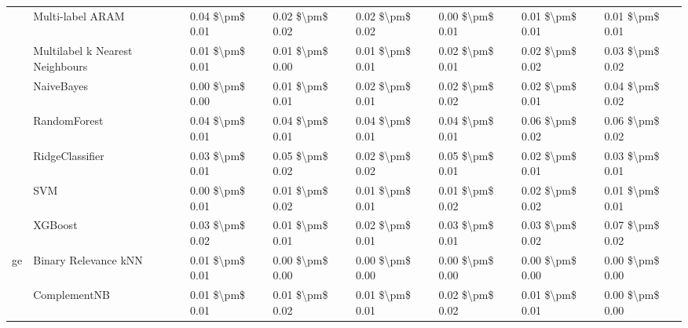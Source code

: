 \begin{tabular}{llllllll}
   & Multi-label ARAM &  0.04 \$\textbackslash pm\$ 0.01 &           0.02 \$\textbackslash pm\$ 0.02 &       0.02 \$\textbackslash pm\$ 0.02 &        0.00 \$\textbackslash pm\$ 0.01 &                         0.01 \$\textbackslash pm\$ 0.01 &      0.01 \$\textbackslash pm\$ 0.01 \\
   & Multilabel k Nearest Neighbours &  0.01 \$\textbackslash pm\$ 0.01 &           0.01 \$\textbackslash pm\$ 0.00 &       0.01 \$\textbackslash pm\$ 0.01 &        0.02 \$\textbackslash pm\$ 0.01 &                         0.02 \$\textbackslash pm\$ 0.02 &      0.03 \$\textbackslash pm\$ 0.02 \\
   & NaiveBayes &  0.00 \$\textbackslash pm\$ 0.00 &           0.01 \$\textbackslash pm\$ 0.01 &       0.02 \$\textbackslash pm\$ 0.01 &        0.02 \$\textbackslash pm\$ 0.02 &                         0.02 \$\textbackslash pm\$ 0.01 &      0.04 \$\textbackslash pm\$ 0.02 \\
   & RandomForest &  0.04 \$\textbackslash pm\$ 0.01 &           0.04 \$\textbackslash pm\$ 0.01 &       0.04 \$\textbackslash pm\$ 0.01 &        0.04 \$\textbackslash pm\$ 0.01 &                         0.06 \$\textbackslash pm\$ 0.02 &      0.06 \$\textbackslash pm\$ 0.02 \\
   & RidgeClassifier &  0.03 \$\textbackslash pm\$ 0.01 &           0.05 \$\textbackslash pm\$ 0.02 &       0.02 \$\textbackslash pm\$ 0.02 &        0.05 \$\textbackslash pm\$ 0.01 &                         0.02 \$\textbackslash pm\$ 0.01 &      0.03 \$\textbackslash pm\$ 0.01 \\
   & SVM &  0.00 \$\textbackslash pm\$ 0.01 &           0.01 \$\textbackslash pm\$ 0.02 &       0.01 \$\textbackslash pm\$ 0.01 &        0.01 \$\textbackslash pm\$ 0.02 &                         0.02 \$\textbackslash pm\$ 0.02 &      0.01 \$\textbackslash pm\$ 0.01 \\
   & XGBoost &  0.03 \$\textbackslash pm\$ 0.02 &           0.01 \$\textbackslash pm\$ 0.01 &       0.02 \$\textbackslash pm\$ 0.01 &        0.03 \$\textbackslash pm\$ 0.01 &                         0.03 \$\textbackslash pm\$ 0.02 &      0.07 \$\textbackslash pm\$ 0.02 \\
ge & Binary Relevance kNN &  0.01 \$\textbackslash pm\$ 0.01 &           0.00 \$\textbackslash pm\$ 0.00 &       0.00 \$\textbackslash pm\$ 0.00 &        0.00 \$\textbackslash pm\$ 0.00 &                         0.00 \$\textbackslash pm\$ 0.00 &      0.00 \$\textbackslash pm\$ 0.00 \\
   & ComplementNB &  0.01 \$\textbackslash pm\$ 0.01 &           0.01 \$\textbackslash pm\$ 0.02 &       0.01 \$\textbackslash pm\$ 0.01 &        0.02 \$\textbackslash pm\$ 0.02 &                         0.01 \$\textbackslash pm\$ 0.01 &      0.00 \$\textbackslash pm\$ 0.00 \\

\end{tabular}
